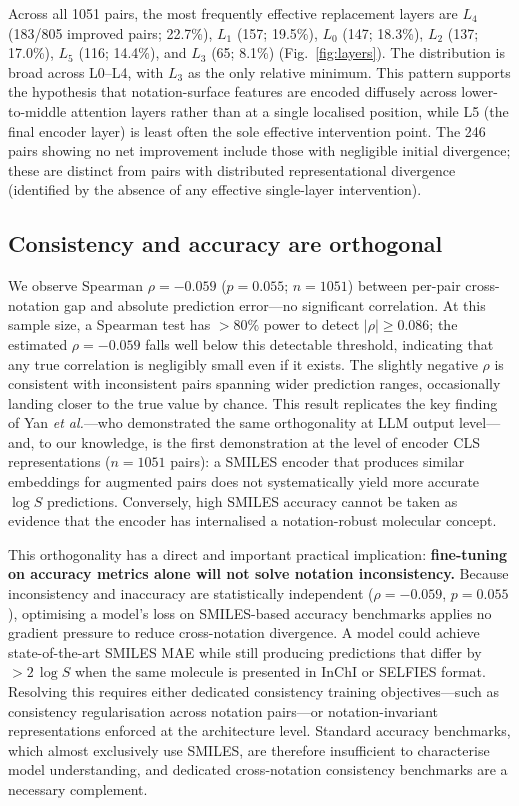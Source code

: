 \documentclass[twoside,twocolumn,9pt]{article}
\newcommand{\logS}{\ensuremath{\log S}}
\begin{document}
Across all 1051 pairs, the most frequently effective replacement layers are $L_4$ (183/805 improved pairs; 22.7\%), $L_1$ (157; 19.5\%), $L_0$ (147; 18.3\%), $L_2$ (137; 17.0\%), $L_5$ (116; 14.4\%), and $L_3$ (65; 8.1\%) (Fig.~\ref{fig:layers}). The distribution is broad across L0--L4, with $L_3$ as the only relative minimum. This pattern supports the hypothesis that notation-surface features are encoded diffusely across lower-to-middle attention layers rather than at a single localised position, while L5 (the final encoder layer) is least often the sole effective intervention point. The 246 pairs showing no net improvement include those with negligible initial divergence; these are distinct from pairs with distributed representational divergence (identified by the absence of any effective single-layer intervention).

\subsection{Consistency and accuracy are orthogonal}

We observe Spearman $\rho = -0.059$ ($p=0.055$; $n=1051$) between per-pair cross-notation gap and absolute prediction error---no significant correlation. At this sample size, a Spearman test has $>80\%$ power to detect $|\rho|\geq 0.086$; the estimated $\rho=-0.059$ falls well below this detectable threshold, indicating that any true correlation is negligibly small even if it exists. The slightly negative $\rho$ is consistent with inconsistent pairs spanning wider prediction ranges, occasionally landing closer to the true value by chance. This result replicates the key finding of Yan \textit{et al.}\cite{yan2025}---who demonstrated the same orthogonality at LLM output level---and, to our knowledge, is the first demonstration at the level of encoder CLS representations ($n=1051$ pairs): a SMILES encoder that produces similar embeddings for augmented pairs does not systematically yield more accurate $\logS$ predictions. Conversely, high SMILES accuracy cannot be taken as evidence that the encoder has internalised a notation-robust molecular concept.

This orthogonality has a direct and important practical implication: \textbf{fine-tuning on accuracy metrics alone will not solve notation inconsistency.} Because inconsistency and inaccuracy are statistically independent ($\rho=-0.059$, $p=0.055$), optimising a model's loss on SMILES-based accuracy benchmarks applies no gradient pressure to reduce cross-notation divergence. A model could achieve state-of-the-art SMILES MAE while still producing predictions that differ by $>2\,\logS$ when the same molecule is presented in InChI or SELFIES format. Resolving this requires either dedicated consistency training objectives---such as consistency regularisation across notation pairs---or notation-invariant representations enforced at the architecture level. Standard accuracy benchmarks, which almost exclusively use SMILES,\cite{ganeeva2025} are therefore insufficient to characterise model understanding, and dedicated cross-notation consistency benchmarks are a necessary complement.
\end{document}
